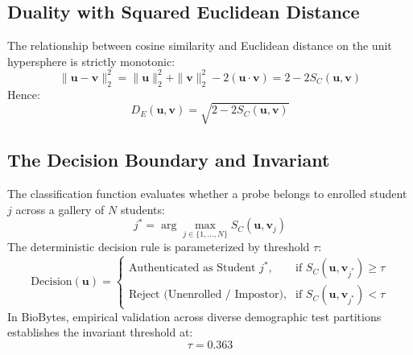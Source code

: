 \subsection{Duality with Squared Euclidean Distance}
The relationship between cosine similarity and Euclidean distance on the unit hypersphere is strictly monotonic:
\begin{equation}
\|\mathbf{u} - \mathbf{v}\|_2^2 = \|\mathbf{u}\|_2^2 + \|\mathbf{v}\|_2^2 - 2(\mathbf{u} \cdot \mathbf{v}) = 2 - 2 S_C(\mathbf{u}, \mathbf{v})
\end{equation}
Hence:
\begin{equation}
D_E(\mathbf{u}, \mathbf{v}) = \sqrt{2 - 2 S_C(\mathbf{u}, \mathbf{v})}
\end{equation}

\subsection{The Decision Boundary and Invariant}
The classification function evaluates whether a probe belongs to enrolled student $j$ across a gallery of $N$ students:
\begin{equation}
j^* = \arg\max_{j \in \{1, \dots, N\}} S_C(\mathbf{u}, \mathbf{v}_j)
\end{equation}
The deterministic decision rule is parameterized by threshold $\tau$:
\begin{equation}
\text{Decision}(\mathbf{u}) = \begin{cases} 
\text{Authenticated as Student } j^*, & \text{if } S_C(\mathbf{u}, \mathbf{v}_{j^*}) \geq \tau \\
\text{Reject (Unenrolled / Impostor)}, & \text{if } S_C(\mathbf{u}, \mathbf{v}_{j^*}) < \tau
\end{cases}
\end{equation}
In BioBytes, empirical validation across diverse demographic test partitions establishes the invariant threshold at:
\begin{equation}
\tau = 0.363
\end{equation}

